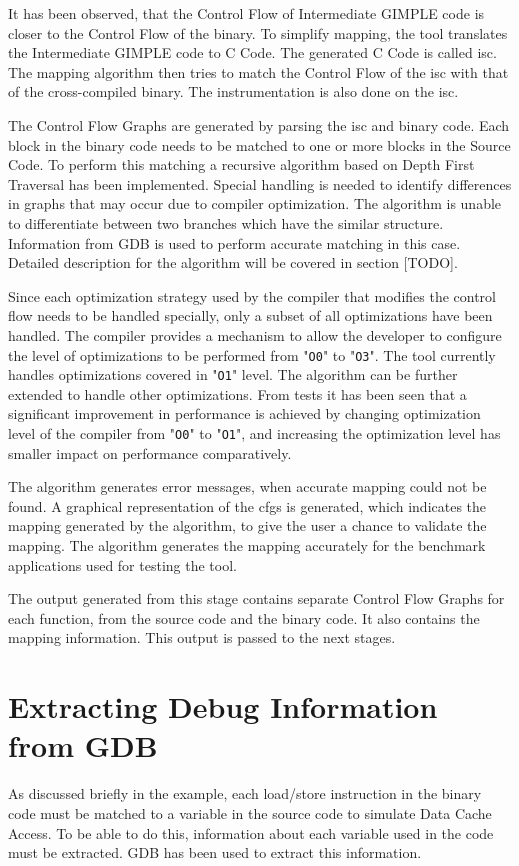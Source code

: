 It has been observed, that the Control Flow of Intermediate GIMPLE code is closer to the Control Flow of the binary. To simplify mapping, the tool translates the Intermediate GIMPLE code to C Code. The generated C Code is called \gls{isc}. The mapping algorithm then tries to match the Control Flow of the \gls{isc} with that of the cross-compiled binary. The instrumentation is also done on the \gls{isc}.

The Control Flow Graphs are generated by parsing the \gls{isc} and binary code. Each block in the binary code needs to be matched to one or more blocks in the Source Code. To perform this matching a recursive algorithm based on Depth First Traversal has been implemented. Special handling is needed to identify differences in graphs that may occur due to compiler optimization. The algorithm is unable to differentiate between two branches which have the similar structure. Information from GDB is used to perform accurate matching in this case. Detailed description for the algorithm will be covered in section [TODO].

Since each optimization strategy used by the compiler that modifies the control flow needs to be handled specially, only a subset of all optimizations have been handled. The compiler provides a mechanism to allow the developer to configure the level of optimizations to be performed from "\texttt{O0}" to "\texttt{O3}". The tool currently handles optimizations covered in "\texttt{O1}" level. The algorithm can be further extended to handle other optimizations. From tests it has been seen that a significant improvement in performance is achieved by changing optimization level of the compiler from "\texttt{O0}" to "\texttt{O1}", and increasing the optimization level has smaller impact on performance comparatively. 

The algorithm generates error messages, when accurate mapping could not be found. A graphical representation of the \gls{cfg}s is generated, which indicates the mapping generated by the algorithm, to give the user a chance to validate the mapping. The algorithm generates the mapping accurately for the benchmark applications used for testing the tool.

The output generated from this stage contains separate Control Flow Graphs for each function, from the source code and the binary code. It also contains the mapping information. This output is passed to the next stages.

\section{Extracting Debug Information from GDB}
\label{sec:C3GDBInfo}
As discussed briefly in the example, each load/store instruction in the binary code must be matched to a variable in the source code to simulate Data Cache Access. To be able to do this, information about each variable used in the code must be extracted. GDB has been used to extract this information.

